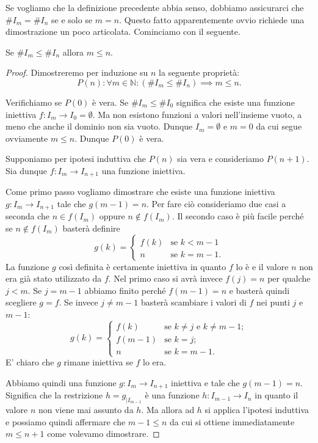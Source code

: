 \documentclass[italian,a4paper,hidelinks,headinclude]{scrartcl}
\newcommand{\NN}{{\mathbb N}}
\newcommand{\enclose}[1]{\left({#1}\right)}
\begin{document}
Se vogliamo che la definizione precedente abbia senso,
dobbiamo assicurarci che $\# I_m = \# I_n$ se e solo se $m=n$.
Questo fatto apparentemente ovvio richiede una dimostrazione
un poco articolata. Cominciamo con il seguente.

\begin{lemma}\label{lemma:3834}
  Se $\# I_m \le \# I_n$ allora $m\le n$.
\end{lemma}
%
\begin{proof}
  Dimostreremo per induzione su $n$ la seguente proprietà:
  \[
    P(n)\colon \forall m\in \NN\colon \enclose{\#I_m\le \#I_n}\implies m\le n.
  \]

Verifichiamo se $P(0)$ è vera. Se $\#I_m\le \#I_0$ significa che esiste una
funzione iniettiva $f\colon I_m \to I_0 = \emptyset$. Ma non esistono funzioni
a valori nell'insieme vuoto, a meno che anche il dominio non sia vuoto. Dunque
$I_m=\emptyset$ e $m=0$ da cui segue ovviamente $m\le n$. Dunque $P(0)$ è vera.

Supponiamo per ipotesi induttiva che $P(n)$ sia vera e consideriamo $P(n+1)$.
Sia dunque $f\colon I_m \to I_{n+1}$ una funzione iniettiva.

Come primo passo vogliamo dimostrare che esiste una funzione iniettiva
$g\colon I_m \to I_{n+1}$ tale che $g(m-1)=n$.
Per fare ciò consideriamo due casi a seconda che $n\in f(I_m)$
oppure $n\not \in f(I_m)$.
Il secondo caso è più facile perché se $n\not \in f(I_m)$ basterà definire
\[
  g(k) =
  \begin{cases}
    f(k) & \text{se $k<m-1$}\\
    n & \text{se $k=m-1$}.
  \end{cases}
\]
La funzione $g$ così definita è certamente iniettiva in quanto $f$ lo è e il
valore $n$ non era già stato utilizzato da $f$.
Nel primo caso si avrà invece $f(j)=n$ per qualche $j<m$.
Se $j=m-1$ abbiamo finito perché $f(m-1)=n$ e basterà quindi scegliere $g=f$.
Se invece $j\neq m-1$ basterà scambiare i valori di $f$ nei punti $j$ e $m-1$:
\[
g(k) =
\begin{cases}
  f(k) & \text{se $k\neq j$ e $k\neq m-1$};\\
  f(m-1) & \text{se $k=j$};\\
  n & \text{se $k=m-1$}.
\end{cases}
\]
E' chiaro che $g$ rimane iniettiva se $f$ lo era.

Abbiamo quindi una funzione $g\colon I_m \to I_{n+1}$ iniettiva e tale
che $g(m-1)=n$. Significa che la restrizione $h = g_{|I_{m-1}}$ è una funzione
$h\colon I_{m-1}\to I_n$ in quanto il valore $n$ non viene mai assunto da $h$.
Ma allora ad $h$ si applica l'ipotesi induttiva e possiamo quindi affermare che
$m-1\le n$ da cui si ottiene immediatamente $m\le n+1$ come volevamo dimostrare.
\end{proof}
\end{document}
